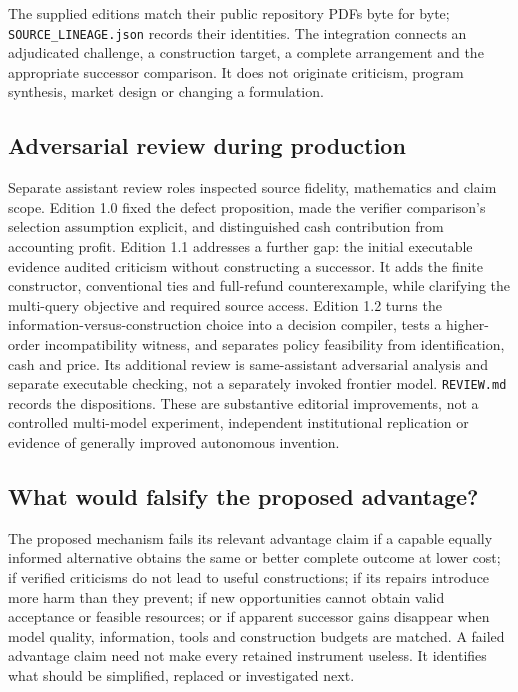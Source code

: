 The supplied editions match their public repository PDFs byte for byte; \texttt{SOURCE\_LINEAGE.json} records their identities. The integration connects an adjudicated challenge, a construction target, a complete arrangement and the appropriate successor comparison. It does not originate criticism, program synthesis, market design or changing a formulation.

\subsection{Adversarial review during production}
Separate assistant review roles inspected source fidelity, mathematics and claim scope. Edition 1.0 fixed the defect proposition, made the verifier comparison's selection assumption explicit, and distinguished cash contribution from accounting profit. Edition 1.1 addresses a further gap: the initial executable evidence audited criticism without constructing a successor. It adds the finite constructor, conventional ties and full-refund counterexample, while clarifying the multi-query objective and required source access. Edition 1.2 turns the information-versus-construction choice into a decision compiler, tests a higher-order incompatibility witness, and separates policy feasibility from identification, cash and price. Its additional review is same-assistant adversarial analysis and separate executable checking, not a separately invoked frontier model. \texttt{REVIEW.md} records the dispositions. These are substantive editorial improvements, not a controlled multi-model experiment, independent institutional replication or evidence of generally improved autonomous invention.

\subsection{What would falsify the proposed advantage?}
The proposed mechanism fails its relevant advantage claim if a capable equally informed alternative obtains the same or better complete outcome at lower cost; if verified criticisms do not lead to useful constructions; if its repairs introduce more harm than they prevent; if new opportunities cannot obtain valid acceptance or feasible resources; or if apparent successor gains disappear when model quality, information, tools and construction budgets are matched. A failed advantage claim need not make every retained instrument useless. It identifies what should be simplified, replaced or investigated next.
